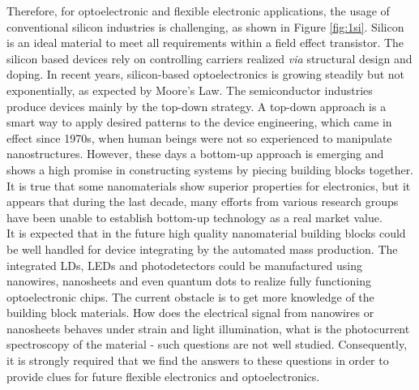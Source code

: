 Therefore, for optoelectronic and flexible electronic applications, the usage of conventional silicon industries is challenging, as shown in Figure \ref{fig:1si}. Silicon  is an ideal material to meet all requirements within a field effect transistor. The silicon based devices rely on controlling carriers realized \textit{via} structural design and doping. In recent years, silicon-based optoelectronics is growing steadily but not exponentially, as expected by Moore's Law. \cite{Waldrop2016} 
The semiconductor industries produce devices mainly by the top-down strategy. A top-down approach is a smart way to apply desired patterns to the device engineering, which came in effect since 1970s, when human beings were not so experienced to manipulate nanostructures. However, these days a bottom-up approach is emerging and shows a high promise in constructing systems by piecing building blocks together. It is true that some nanomaterials show superior properties for electronics, but it appears that during the last decade, many efforts from various research groups have been unable to establish bottom-up technology as a real market value. \\
It is expected that in the future high quality nanomaterial building blocks could be well handled for device integrating by the automated mass production. The integrated LDs, LEDs and photodetectors could be manufactured using nanowires, nanosheets and even quantum dots to realize fully functioning optoelectronic chips. The current obstacle is to get more knowledge of the building block materials. How does the electrical signal from nanowires or nanosheets behaves under strain and light illumination, what is the photocurrent spectroscopy of the material - such questions are not well studied. Consequently, it is strongly required that we find the answers to these questions in order to provide clues for future flexible electronics and optoelectronics. 

